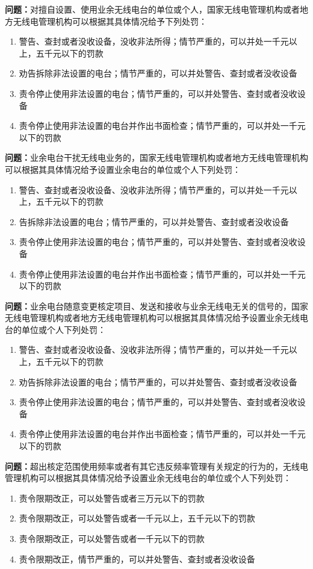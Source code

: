 
\textbf{问题：}对擅自设置、使用业余无线电台的单位或个人，国家无线电管理机构或者地方无线电管理机构可以根据其具体情况给予下列处罚：
\begin{enumerate}[label=\Alph*), leftmargin=1cm]
	\item  警告、查封或者没收设备，没收非法所得；情节严重的，可以并处一千元以上，五千元以下的罚款
	\item  劝告拆除非法设置的电台；情节严重的，可以并处警告、查封或者没收设备
	\item  责令停止使用非法设置的电台；情节严重的，可以并处警告、查封或者没收设备
	\item  责令停止使用非法设置的电台并作出书面检查；情节严重的，可以并处一千元以下的罚款
\end{enumerate}

\textbf{问题：}业余电台干扰无线电业务的，国家无线电管理机构或者地方无线电管理机构可以根据其具体情况给予设置业余电台的单位或个人下列处罚：
\begin{enumerate}[label=\Alph*), leftmargin=1cm]
	\item  警告、查封或者没收设备、没收非法所得；情节严重的，可以并处一千元以上，五千元以下的罚款
	\item  告拆除非法设置的电台；情节严重的，可以并处警告、查封或者没收设备
	\item  责令停止使用非法设置的电台；情节严重的，可以并处警告、查封或者没收设备
	\item  责令停止使用非法设置的电台并作出书面检查；情节严重的，可以并处一千元以下的罚款
\end{enumerate}

\textbf{问题：}业余电台随意变更核定项目、发送和接收与业余无线电无关的信号的，国家无线电管理机构或者地方无线电管理机构可以根据其具体情况给予设置业余无线电台的单位或个人下列处罚：
\begin{enumerate}[label=\Alph*), leftmargin=1cm]
	\item  警告、查封或者没收设备、没收非法所得；情节严重的，可以并处一千元以上，五千元以下的罚款
	\item  劝告拆除非法设置的电台；情节严重的，可以并处警告、查封或者没收设备
	\item  责令停止使用非法设置的电台；情节严重的，可以并处警告、查封或者没收设备
	\item  责令停止使用非法设置的电台并作出书面检查；情节严重的，可以并处一千元以下的罚款
\end{enumerate}

\textbf{问题：}超出核定范围使用频率或者有其它违反频率管理有关规定的行为的，无线电管理机构可以根据其具体情况给予设置业余无线电台的单位或个人下列处罚：
\begin{enumerate}[label=\Alph*), leftmargin=1cm]
  \item 责令限期改正，可以处警告或者三万元以下的罚款
  \item 责令限期改正，可以处警告或者一千元以上，五千元以下的罚款
  \item 责令限期改正，可以处警告或者一千元以下的罚款
  \item 责令限期改正，情节严重的，可以并处警告、查封或者没收设备
\end{enumerate}

